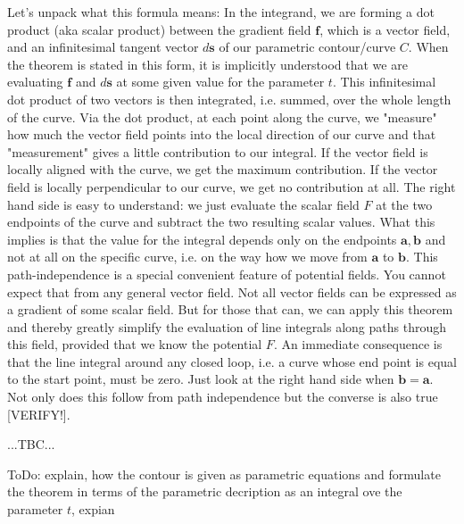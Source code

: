 Let's unpack what this formula means: In the integrand, we are forming a dot product (aka scalar product) between the gradient field $\mathbf{f}$, which is a vector field, and an infinitesimal tangent vector $d\mathbf{s}$ of our parametric contour/curve $C$. When the theorem is stated in this form, it is implicitly understood that we are evaluating $\mathbf{f}$ and $d\mathbf{s}$ at some given value for the parameter $t$. This infinitesimal dot product of two vectors is then integrated, i.e. summed, over the whole length of the curve. Via the dot product, at each point along the curve, we "measure" how much the vector field points into the local direction of our curve and that "measurement" gives a little contribution to our integral. If the vector field is locally aligned with the curve, we get the maximum contribution. If the vector field is locally perpendicular to our curve, we get no contribution at all. The right hand side is easy to understand: we just evaluate the scalar field $F$ at the two endpoints of the curve and subtract the two resulting scalar values. What this implies is that the value for the integral depends only on the endpoints $\mathbf{a,b}$ and not at all on the specific curve, i.e. on the way how we move from $\mathbf{a}$ to $\mathbf{b}$. This path-independence is a special convenient feature of potential fields. You cannot expect that from any general vector field. Not all vector fields can be expressed as a gradient of some scalar field. But for those that can, we can apply this theorem and thereby greatly simplify the evaluation of line integrals along paths through this field, provided that we know the potential $F$. An immediate consequence is that the line integral around any closed loop, i.e. a curve whose end point is equal to the start point, must be zero. Just look at the right hand side when $\mathbf{b = a}$. Not only does this follow from path independence but the converse is also true [VERIFY!].

...TBC...

ToDo: explain, how the contour is given as parametric equations and formulate the theorem in terms of the parametric decription as an integral ove the parameter $t$, expian



